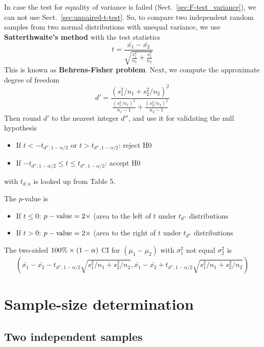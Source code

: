 In case the test for equality of variance is failed
(Sect.~\ref{sec:F-test_variance}), we can not use
Sect.~\ref{sec:unpaired-t-test}. So, to compare two independent random
samples from two normal distributions with unequal variance, we use
{\bf Satterthwaite's method} with the test statistics
\begin{equation}
  \label{eq:88}
  t = \frac{\bar{x_1} - \bar{x_2}} {\sqrt{\frac{s_1^2}{n_1}+\frac{s_2^2}{n_2}}}
\end{equation}
This is known as {\bf Behrens-Fisher problem}. Next, we compute the
approximate degree of freedom
\begin{equation}
  \label{eq:89}
  d' = \frac{\left( s_1^2/n_1 + s_2^2/n_2\right)^2}{\frac{(s_1^2/n_1)^2}{n_1-1}+\frac{(s_2^2/n_2)^2}{n_2-1}}
\end{equation}
Then round $d'$ to the nearest integer $d''$, and use it for
validating the null hypothesis
\begin{itemize}
\item If $ t < -t_{d'', 1-\alpha/2}$ or $t > t_{d'', 1-\alpha/2}$:
  reject H0
\item If $  -t_{d'', 1-\alpha/2} \le t \le t_{d'', 1-\alpha/2}$:
  accept H0
\end{itemize}
with $t_{d,u}$ is looked up from Table 5. 

The $p$-value is
\begin{itemize}
\item If $ t \le 0$: $p-\text{value} = 2\times$ (area to the left of $t$ under
  $t_{d''}$ distributions
\item If $ t > 0$: $p-\text{value} = 2\times$ (area to the right of $t$ under
  $t_{d''}$ distributions
\end{itemize}

The two-sided $100\%\times (1-\alpha)$ CI for $(\mu_1-\mu_2)$ with $\sigma_1^2$ not equal
$\sigma_2^2$ is 
\begin{equation}
  \label{eq:90}
  \left(\bar{x_1}-\bar{x_2} -
    t_{d'',1-\alpha/2}\sqrt{s_1^2/n_1+s_2^2/n_2}, \bar{x_1}-\bar{x_2} +
    t_{d'',1-\alpha/2}\sqrt{s_1^2/n_1+s_2^2/n_2} \right)
\end{equation}

\section{Sample-size determination}
\label{sec:sample-size-determ-2}

\subsection{Two independent samples}
\label{sec:two-indep-sampl}


